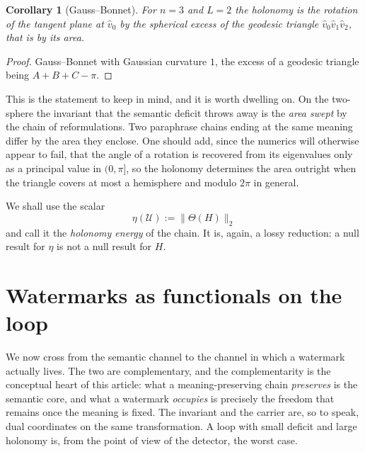 \documentclass[11pt,a4paper]{article}
\theoremstyle{plain}
\newtheorem{corollary}[theorem]{Corollary}
\theoremstyle{definition}
\numberwithin{equation}{section}
\newcommand{\Uc}{\mathcal{U}}
\begin{document}
\begin{corollary}[Gauss--Bonnet]\label{cor:gaussbonnet}
For $n = 3$ and $L = 2$ the holonomy is the rotation of the tangent
plane at $\hat{v}_0$ by the spherical excess of the geodesic triangle
$\hat{v}_0\hat{v}_1\hat{v}_2$, that is by its area.
\end{corollary}

\begin{proof}
Gauss--Bonnet with Gaussian curvature $1$, the excess of a geodesic
triangle being $A+B+C-\pi$.
\end{proof}

This is the statement to keep in mind, and it is worth dwelling on. On
the two-sphere the invariant that the semantic deficit throws away is
the \emph{area swept} by the chain of reformulations. Two paraphrase
chains ending at the same meaning differ by the area they enclose. One
should add, since the numerics will otherwise appear to fail, that the
angle of a rotation is recovered from its eigenvalues only as a
principal value in $(0,\pi]$, so the holonomy determines the area
outright when the triangle covers at most a hemisphere and modulo
$2\pi$ in general.

We shall use the scalar
\begin{equation}\label{eq:holenergy}
\eta(\Uc) := \|\Theta(H)\|_2
\end{equation}
and call it the \emph{holonomy energy} of the chain. It is, again, a
lossy reduction: a null result for $\eta$ is not a null result for $H$.

\section{Watermarks as functionals on the loop}\label{sec:watermark}

We now cross from the semantic channel to the channel in which a
watermark actually lives. The two are complementary, and the complementarity
is the conceptual heart of this article: what a meaning-preserving chain
\emph{preserves} is the semantic core, and what a watermark
\emph{occupies} is precisely the freedom that remains once the meaning is
fixed. The invariant and the carrier are, so to speak, dual coordinates
on the same transformation. A loop with small deficit and large holonomy
is, from the point of view of the detector, the worst case.
\end{document}

